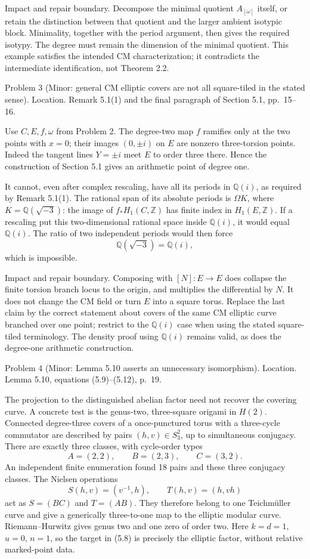 \documentclass[10pt]{article}
\begin{document}
Impact and repair boundary. Decompose the minimal quotient \(A_{[\omega]}\) itself, or retain the distinction between that quotient and the larger ambient isotypic block. Minimality, together with the period argument, then gives the required isotypy. The degree must remain the dimension of the minimal quotient. This example satisfies the intended CM characterization; it contradicts the intermediate identification, not Theorem 2.2.\par
Problem 3 (Minor: general CM elliptic covers are not all square-tiled in the stated sense).  Location. Remark 5.1(1) and the final paragraph of Section 5.1, pp. 15–16.\par
Use \(C,E,f,\omega\) from Problem 2. The degree-two map \(f\) ramifies only at the two points with \(x=0\); their images \((0,\pm i)\) on \(E\) are nonzero three-torsion points. Indeed the tangent lines \(Y=\pm i\) meet \(E\) to order three there. Hence the construction of Section 5.1 gives an arithmetic point of degree one.\par
It cannot, even after complex rescaling, have all its periods in \(\mathbb Q(i)\), as required by Remark 5.1(1). The rational span of its absolute periods is \(\Omega K\), where \(K=\mathbb Q(\sqrt{-3})\): the image of \(f_*H_1(C,\mathbb Z)\) has finite index in \(H_1(E,\mathbb Z)\). If a rescaling put this two-dimensional rational space inside \(\mathbb Q(i)\), it would equal \(\mathbb Q(i)\). The ratio of two independent periods would then force \[\mathbb Q(\sqrt{-3})=\mathbb Q(i),\] which is impossible.\par
Impact and repair boundary. Composing with \([N]:E\to E\) does collapse the finite torsion branch locus to the origin, and multiplies the differential by \(N\). It does not change the CM field or turn \(E\) into a square torus. Replace the last claim by the correct statement about covers of the same CM elliptic curve branched over one point; restrict to the \(\mathbb Q(i)\) case when using the stated square-tiled terminology. The density proof using \(\mathbb Q(i)\) remains valid, as does the degree-one arithmetic construction.\par
Problem 4 (Minor: Lemma 5.10 asserts an unnecessary isomorphism).  Location. Lemma 5.10, equations (5.9)–(5.12), p. 19.\par
The projection to the distinguished abelian factor need not recover the covering curve. A concrete test is the genus-two, three-square origami in \(H(2)\). Connected degree-three covers of a once-punctured torus with a three-cycle commutator are described by pairs \((h,v)\in S_3^2\), up to simultaneous conjugacy. There are exactly three classes, with cycle-order types \[A=(2,2),\qquad B=(2,3),\qquad C=(3,2).\] An independent finite enumeration found 18 pairs and these three conjugacy classes. The Nielsen operations \[S(h,v)=(v^{-1},h),\qquad T(h,v)=(h,vh)\] act as \(S=(BC)\) and \(T=(AB)\). They therefore belong to one Teichmüller curve and give a generically three-to-one map to the elliptic modular curve. Riemann–Hurwitz gives genus two and one zero of order two. Here \(k=d=1\), \(u=0\), \(n=1\), so the target in (5.8) is precisely the elliptic factor, without relative marked-point data.\par
\end{document}
